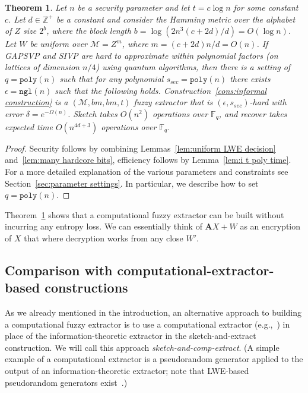 \documentclass[11pt]{article}
\newcommand{\secref}[1]{\mbox{Section~\ref{#1}}}
\newcommand{\thref}[1]{\mbox{Theorem~\ref{#1}}}
\newcommand{\lemref}[1]{\mbox{Lemma~\ref{#1}}}
\newcommand{\consref}[1]{\mbox{Construction~\ref{#1}}}
\newcommand{\zo}{\ensuremath{\{0, 1\}}}
\newcommand{\vect}[1]{\ensuremath{\textbf{#1}}}
\newcommand{\Fq}{\ensuremath{\mathbb{F}_q}}
\newcommand{\poly}{\ensuremath{\mathtt{poly}}\xspace}
\newcommand{\ngl}{\ensuremath{\mathtt{ngl}}\xspace}
\newtheorem{theorem}{Theorem}[section]
\newcommand{\vA}{\vect{A}}
\newcommand{\M}{\mathcal{M}}
\begin{document}
\begin{theorem}
\label{thm:lossless secure extractor log}
Let $n$ be a security parameter and let $t = c\log n$ for some constant $c$.    Let $d\in \mathbb{Z}^+$ be a constant and consider the Hamming metric over the alphabet of $Z$ size $2^b$, where the  block length $b = \log (2n^3 (c+2d)/d)=O(\log n)$.  Let $W$ be uniform over $\mathcal{M}=Z^m$, where $m={(c+2d)n/d}=O(n)$.  If GAPSVP and SIVP are hard to approximate within polynomial factors (on lattices of dimension $n/4$) using quantum algorithms, then there is a setting of $q = \poly(n)$ such that for any polynomial $s_{sec}=\poly(n)$ there exists $\epsilon=\ngl(n)$ such that the following holds.
\consref{cons:informal construction} is a $(\M, bm, bm, t)$  fuzzy extractor that is $(\epsilon, s_{sec})$-hard with error $\delta = e^{-\Omega(n)}$.
Sketch takes $O(n^2)$ operations over $\Fq$, and recover takes expected time $O(n^{4d+3})$ operations over $\Fq$.
\end{theorem}
\begin{proof}
Security follows by combining Lemmas~\ref{lem:uniform LWE decision} and~\ref{lem:many hardcore bits}, efficiency follows by \lemref{lem:i t poly time}. For a more detailed explanation of the various parameters and constraints see \secref{sec:parameter settings}.  In particular, we describe how to set $q = \poly(n)$.  
\end{proof}


\thref{thm:lossless secure extractor log} shows that a computational fuzzy extractor can be built without incurring any entropy loss.  We can essentially think of $\vA X+W$ as an encryption of $X$ that where decryption works from any close $W'$.

\subsection{Comparison with computational-extractor-based constructions}
\label{sec:prg based comparison}
As we already mentioned in the introduction, an alternative approach to building a computational fuzzy extractor is to use  a computational extractor (e.g.,~\cite{krawczyk2010cryptographic, barak2011leftover, dachman2012computational}) in place of the information-theoretic extractor in the sketch-and-extract construction.  We will call this approach \emph{sketch-and-comp-extract}.  (A simple example of a computational extractor is a pseudorandom generator applied to the output of an information-theoretic extractor; note that LWE-based pseudorandom generators exist~\cite{applebaum2006pseudorandom}.)
\end{document}
